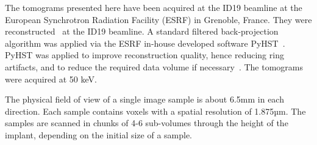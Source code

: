 The tomograms presented here have been acquired at the ID19 beamline at the
European Synchrotron Radiation Facility (ESRF) in Grenoble, France. They were
reconstructed~\citep{sporring} at the ID19 beamline. A standard filtered
back-projection algorithm was applied via the ESRF in-house developed software
PyHST~\citep{NELDAM2015682,pyhst}. PyHST was applied to improve reconstruction
quality, hence reducing ring artifacts, and to reduce the required data volume
if necessary~\cite{MIRONE201441}. The tomograms were acquired at 50 keV.

The physical field of view of a single image sample is about 6.5mm in each
direction. Each sample contains voxels with a spatial resolution of 1.875µm.
The samples are scanned in chunks of 4-6 sub-volumes through the height of the
implant, depending on the initial size of a sample.

